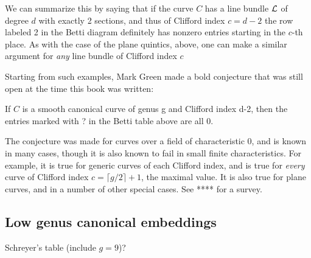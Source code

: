 We can summarize this by saying
that if the curve $C$ has a line bundle ${\mathcal L}$ of degree $d$ with exactly 2 sections, and thus of Clifford index $c = d-2$ the row labeled  2 
in the Betti diagram definitely has nonzero entries starting in the $c$-th place. As with the case of the plane quintics, above, one can
make a similar argument for \emph{any} line bundle of Clifford index $c$

Starting from such examples, Mark Green made a bold conjecture that was still open at the time this book was written:

\begin{conjecture}
If $C$ is a smooth canonical curve of genus g and Clifford index d-2, then the entries marked with ? in the Betti table above are all 0. 
\end{conjecture}

The conjecture was made for curves over a field of characteristic 0, and is known in many cases, though it is also known to fail in small finite characteristics.
For example, it is true for generic curves of each Clifford index, and is true for \emph{every} curve of  Clifford index $c = \lceil g/2\rceil+1$, the maximal value.
It is also true for plane curves, and in a number of other special cases. See **** for a survey.

\subsection{Low genus canonical embeddings} Schreyer's table (include $g=9$)?



